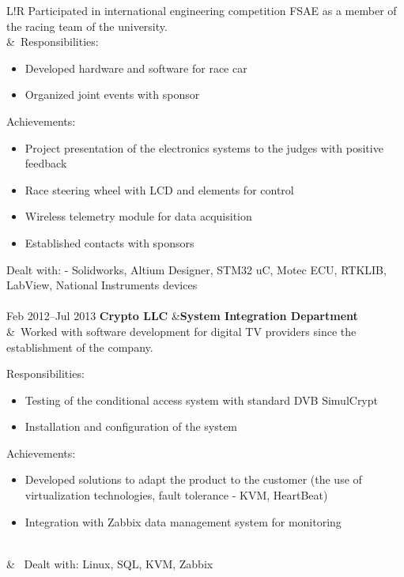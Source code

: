 \documentclass[10pt]{article}
\newcommand\VRule{\color{lightgray}\vrule width 0.5pt}
\begin{document}
\begin{tabular}{L!{\VRule}R}
Participated in international engineering competition FSAE as a member of the racing team of the university.
\\
&\ 
Responsibilities:
\vspace{-\topsep}
\begin{multicols}{2}
\begin{itemize}

	\item Developed hardware and software for race car
	\item Organized joint events with sponsor
\end{itemize}
\end{multicols}
Achievements:
\vspace{-\topsep}
\begin{multicols}{2}
	\begin{itemize}
		\setlength\itemsep{0em}
\item Project presentation of the electronics systems to the judges with positive feedback
\item Race steering wheel with LCD and elements for control
\item Wireless telemetry module for data acquisition
\item Established contacts with sponsors
\end{itemize}
\end{multicols}
Dealt with:
- Solidworks, Altium Designer, STM32 uC, Motec ECU, RTKLIB, LabView, National Instruments devices\\
\\


Feb 2012--Jul 2013 {\bf Crypto LLC}
&{\bf System Integration Department}\\
&\
Worked with software development for digital TV providers since the establishment of the company.

Responsibilities:
\vspace{-\topsep}
\begin{multicols}{2}
	\begin{itemize}
\item Testing of the conditional access system with standard DVB SimulCrypt
\item Installation and configuration of the system
\end{itemize}
\end{multicols}
\vspace{-\topsep}
Achievements:
\vspace{-\topsep}
\begin{multicols}{2}
	\begin{itemize}
\item Developed solutions to adapt the product to the customer (the use of virtualization technologies, fault tolerance - KVM, HeartBeat)
\item Integration with Zabbix data management system for monitoring
\end{itemize}
\end{multicols}
\\ 
&\ 
\vspace{-\topsep}
Dealt with:  Linux, SQL, KVM, Zabbix\\
\\


\end{tabular}
\end{document}
